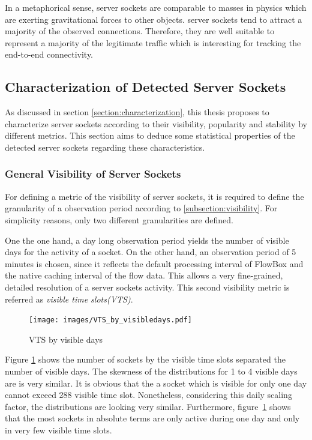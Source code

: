 In a metaphorical sense, \glspl{server socket} are comparable to masses in
physics which are exerting gravitational forces to other objects. \Glspl{server
socket} tend to attract a majority of the observed connections. Therefore, they
are well suitable to represent a majority of the legitimate traffic which is
interesting for tracking the end-to-end connectivity.

\newpage
\subsection{Characterization of Detected Server Sockets}

As discussed in section \ref{section:characterization}, this thesis proposes to
characterize \glspl{server socket} according to their visibility, popularity and
stability by different metrics. This section aims to deduce some statistical
properties of the detected \glspl{server socket} regarding these
characteristics.

\subsubsection{General Visibility of Server Sockets}

For defining a metric of the visibility of \glspl{server socket}, it is required
to define the granularity of a observation period according to
\ref{subsection:visibility}. For simplicity reasons, only two different
granularities are defined.

One the one hand, a day long observation period yields the number of visible
days for the activity of a socket. On the other hand, an observation period of 5
minutes is chosen, since it reflects the default processing interval of FlowBox
and the native caching interval of the flow data. This allows a very
fine-grained, detailed resolution of a \glspl{server socket} activity. This
second visibility metric is referred as \emph{visible time slots(VTS)}.

\begin{figure}
	[hb] \centering
	\texttt{[image: images/VTS\_by\_visibledays.pdf]}
	\caption{VTS by visible days}
	\label{fig:vts_by_visibledays}
\end{figure}

Figure \ref{fig:vts_by_visibledays} shows the number of sockets by the visible
time slots separated the number of visible days. The skewness of the
distributions for 1 to 4 visible days are is very similar. It is obvious that
the a socket which is visible for only one day cannot exceed 288 visible time
slot. Nonetheless, considering this daily scaling factor, the distributions are
looking very similar. Furthermore, figure \ref{fig:vts_by_visibledays} shows
that the most sockets in absolute terms are only active during one day and only
in very few visible time slots.

